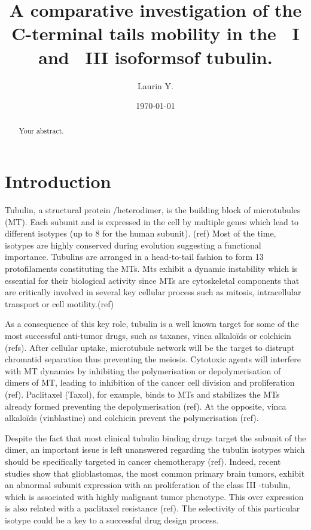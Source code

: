 \documentclass[a4paper]{article}
\title{A comparative investigation of the C-terminal tails mobility in the \beta~I
and \beta~III isoformsof tubulin.}
\author{Laurin Y.}
\date{\today}
\begin{document}
\maketitle

\begin{abstract}
Your abstract.
\end{abstract}

\section{Introduction}

Tubulin, a structural protein \alpha/\beta heterodimer, is the building block of
microtubules (MT). Each subunit \alpha and \beta is expressed in the cell by multiple
genes which lead to different isotypes (up to 8 for the human \beta subunit). (ref)
Most of the time, isotypes are highly conserved during evolution suggesting a functional
importance. Tubulins are arranged in a head-to-tail fashion to form 13 protofilaments
constituting the MTs. Mts exhibit a dynamic instability which is essential for their
biological activity since MTs are cytoskeletal components that are critically involved
in several key cellular process such as mitosis, intracellular transport or cell motility.(ref)

As a consequence of this key role, tubulin is a well known target for some of the
most successful anti-tumor drugs, such as taxanes, vinca alkaloïds or colchicin (refs).
After cellular uptake, microtubule network will be the target to distrupt chromatid
separation thus preventing the meiosis. Cytotoxic agents will interfere with MT
dynamics by inhibiting the polymerisation or depolymerisation of dimers of MT, leading
to inhibition of the cancer cell division and proliferation (ref). Paclitaxel (Taxol), for
example, binds to MTs and stabilizes the MTs already formed preventing the depolymerisation (ref).
At the opposite, vinca alkaloïds (vinblastine) and colchicin prevent the polymerisation (ref).

Despite the fact that most clinical tubulin binding drugs target the \beta subunit
of the dimer, an important issue is left unanswered regarding the tubulin
isotypes which should be specifically targeted in cancer chemotherapy (ref). Indeed,
recent studies show that glioblastomas, the most common primary brain tumors, exhibit
an abnormal \beta subunit expression with an proliferation of the class III \beta-tubulin,
which is associated with highly malignant tumor phenotype. This over expression is also
related with a paclitaxel resistance (ref). The selectivity of this particular isotype could be
a key to a successful drug design process.
\end{document}
